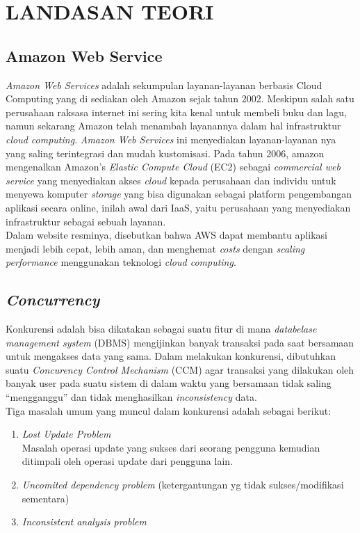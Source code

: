 	\chapter{LANDASAN TEORI}
	
	\section  {Amazon Web Service}
	\textit{Amazon Web Services }adalah sekumpulan layanan-layanan berbasis Cloud Computing yang di sediakan oleh Amazon sejak tahun 2002. Meskipun salah satu perusahaan raksasa internet ini sering kita kenal untuk membeli buku dan lagu, namun sekarang Amazon telah menambah layanannya dalam hal infrastruktur \textit{cloud computing}. \textit{Amazon Web Services} ini menyediakan layanan-layanan nya yang saling terintegrasi dan mudah kustomisasi. Pada tahun 2006, amazon mengenalkan Amazon’s \textit{Elastic Compute Cloud} (EC2) sebagai \textit{commercial web service} yang menyediakan akses \textit{cloud} kepada perusahaan dan individu untuk menyewa komputer \textit{storage} yang bisa digunakan sebagai platform pengembangan aplikasi secara online, inilah awal dari IaaS, yaitu perusahaan yang menyediakan infrastruktur sebagai sebuah layanan\cite{wikipedia_amazon_2016}.
	\\ \indent
	Dalam website resminya, disebutkan bahwa AWS dapat membantu aplikasi menjadi lebih cepat, lebih aman, dan menghemat \textit{costs} dengan \textit{scaling} \textit{performance} menggunakan teknologi \textit{cloud computing}\cite{web_services_amazon_nodate}.
	
	\section{  \textit{Concurrency}}
	Konkurensi adalah bisa dikatakan sebagai suatu fitur di mana \textit{databelase management system} (DBMS) mengijinkan banyak transaksi pada saat bersamaan untuk mengakses data yang sama. Dalam melakukan konkurensi, dibutuhkan suatu \textit{Concurency Control Mechanism }(CCM) agar transaksi yang dilakukan oleh banyak user pada suatu sistem di dalam waktu yang bersamaan tidak saling “mengganggu” dan tidak menghasilkan \textit{inconsistency} data.
	\\ \indent
	Tiga masalah umum yang muncul dalam konkurensi adalah sebagai berikut: 
	\begin{enumerate}
	    	\item \textit{Lost Update Problem }\\ \indent Masalah operasi update yang sukses dari seorang pengguna kemudian ditimpali oleh operasi update dari pengguna lain.
	    	\item\textit{ Uncomited dependency problem } (ketergantungan yg tidak sukses/modifikasi sementara)
	    	\item \textit{Inconsistent analysis problem} \cite{noauthor_sistem_2013}
	\end{enumerate}   
	
